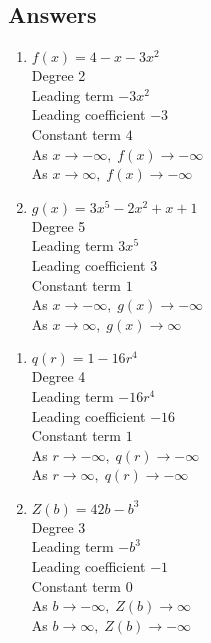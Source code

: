 \documentclass{ximera}
\begin{document}
\subsection{Answers}

\begin{multicols}{2}
\begin{enumerate}

\item $f(x) = 4-x-3x^2$ \\
Degree 2 \\
Leading term $-3x^{2}$\\
Leading coefficient $-3$\\
Constant term $4$\\
As $x \rightarrow -\infty, \; f(x) \rightarrow -\infty$\\
As $x \rightarrow \infty, \; f(x) \rightarrow -\infty$\\

\item  $g(x) = 3x^5 - 2x^2 + x + 1$ \\
Degree 5 \\
Leading term $3x^5$\\
Leading coefficient $3$\\
Constant term $1$\\
As $x \rightarrow -\infty, \; g(x) \rightarrow -\infty$\\
As $x \rightarrow \infty, \; g(x) \rightarrow \infty$\\


\setcounter{HW}{\value{enumi}}
\end{enumerate}
\end{multicols}

\begin{multicols}{2}
\begin{enumerate}
\setcounter{enumi}{\value{HW}}

\item $q(r) = 1 - 16r^{4}$\\
Degree 4 \\
Leading term $-16r^{4}$\\
Leading coefficient $-16$\\
Constant term $1$\\
As $r \rightarrow -\infty, \; q(r) \rightarrow -\infty$\\
As $r \rightarrow \infty, \; q(r) \rightarrow -\infty$\\

\item $Z(b) = 42b - b^{3}$\\
Degree 3 \\
Leading term $-b^{3}$\\
Leading coefficient $-1$\\
Constant term $0$\\
As $b \rightarrow -\infty, \; Z(b) \rightarrow \infty$\\
As $b \rightarrow \infty, \; Z(b) \rightarrow -\infty$\\

\setcounter{HW}{\value{enumi}}
\end{enumerate}
\end{multicols}
\end{document}
